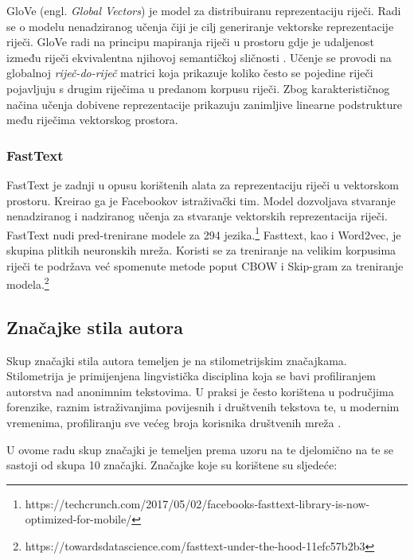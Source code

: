 \documentclass[times, utf8, zavrsni]{fer}
\begin{document}
GloVe (engl. \textit{Global Vectors}) je model za distribuiranu reprezentaciju riječi. Radi se o modelu nenadziranog učenja čiji je cilj generiranje vektorske reprezentacije riječi. GloVe radi na principu mapiranja riječi u prostoru gdje je udaljenost između riječi ekvivalentna njihovoj semantičkoj sličnosti \citep {glove}. Učenje se provodi na globalnoj \textit{riječ-do-riječ} matrici koja prikazuje koliko često se pojedine riječi pojavljuju s drugim riječima u predanom korpusu riječi. Zbog karakterističnog načina učenja dobivene reprezentacije prikazuju zanimljive linearne podstrukture među riječima vektorskog prostora.


\subsubsection{FastText}

FastText je zadnji u opusu korištenih alata za reprezentaciju riječi u vektorskom prostoru. Kreirao ga je Facebookov istraživački tim. Model dozvoljava stvaranje nenadziranog i nadziranog učenja za stvaranje vektorskih reprezentacija riječi. FastText nudi pred-trenirane modele za 294 jezika.\footnote{https://techcrunch.com/2017/05/02/facebooks-fasttext-library-is-now-optimized-for-mobile/} Fasttext, kao i Word2vec, je skupina plitkih neuronskih mreža. Koristi se za treniranje na velikim korpusima riječi te podržava već spomenute metode poput CBOW i Skip-gram za treniranje modela.\footnote{https://towardsdatascience.com/fasttext-under-the-hood-11efc57b2b3}
\newpage


\subsection*{Značajke stila autora}

Skup značajki stila autora temeljen je na stilometrijskim značajkama. Stilometrija je primijenjena lingvistička disciplina koja se bavi profiliranjem autorstva nad anonimnim tekstovima. U praksi je često korištena u područjima forenzike, raznim istraživanjima povijesnih i društvenih tekstova te, u modernim vremenima, profiliranju sve većeg broja korisnika društvenih mreža \citep{stilometrija}.

U ovome radu skup značajki je temeljen prema uzoru na \cite{rangel2013} te djelomično na \cite{rangle2015} te se sastoji od skupa 10 značajki. Značajke koje su korištene su sljedeće:
\end{document}
